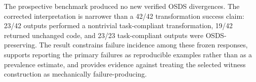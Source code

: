 The prospective benchmark produced no new verified OSDS divergences. The corrected interpretation is narrower than a 42/42 transformation success claim: 23/42 outputs performed a nontrivial task-compliant transformation, 19/42 returned unchanged code, and 23/23 task-compliant outputs were OSDS-preserving. The result constrains failure incidence among these frozen responses, supports reporting the primary failures as reproducible examples rather than as a prevalence estimate, and provides evidence against treating the selected witness construction as mechanically failure-producing.
